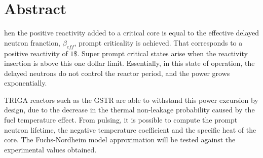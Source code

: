 %
%
%

\chapter*{Abstract}
\begin{SingleSpace}
hen the positive reactivity added to a critical core is equal to the effective delayed neutron franction, $\beta_{eff}$, prompt criticality is achieved. That corresponds to a positive reactivity of $1\$$. Super prompt critical states arise when the reactivity insertion is above this one dollar limit. Essentially, in this state of operation, the delayed neutrons do not control the reactor period, and the power grows exponentially.

TRIGA reactors such as the GSTR are able to withstand this power excursion by design, due to the decrease in the thermal non-leakage probability caused by the fuel temperature effect. From pulsing, it is possible to compute the prompt neutron lifetime, the negative temperature coefficient and the specific heat of the core. The Fuchs-Nordheim model approximation will be tested against the experimental values obtained.

\end{SingleSpace}
\clearpage
